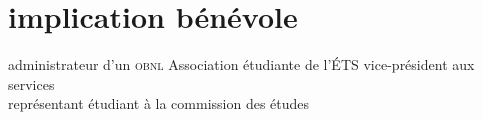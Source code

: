 \documentclass[]{friggeri-cv}
\newif\ifenglish
\begin{document}
\ifenglish\section{implication bénévole}\else\section{implication bénévole}\fi
\begin{entrylist}
  \ifenglish
    \entry {depuis 2013} {administrateur d'un \textsc{obnl}} {Association étudiante de l'ÉTS} {vice-président aux services\\représentant étudiant à la commission des études}
  \else
     {administrateur d'un \textsc{obnl}} {Association étudiante de l'ÉTS} {vice-président aux services\\représentant étudiant à la commission des études}
  \fi
\end{entrylist}
\newpage
\end{document}
